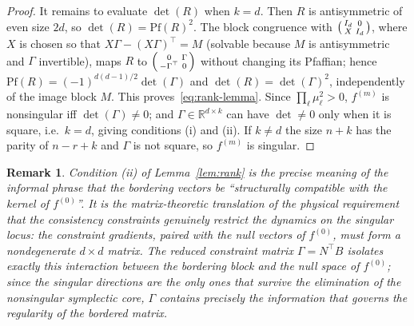 \documentclass[11pt,a4paper]{article}
\newtheorem{remark}{Remark}
\begin{document}
\begin{proof}
	It remains to evaluate $\det(R)$ when $k=d$. Then $R$ is antisymmetric of even size $2d$, so $\det(R)=\mathrm{Pf}(R)^2$. The block congruence with $\begin{psmallmatrix} I_d & 0 \\ X & I_d \end{psmallmatrix}$, where $X$ is chosen so that $X\Gamma - (X\Gamma)^{\top} = M$ (solvable because $M$ is antisymmetric and $\Gamma$ invertible), maps $R$ to $\begin{psmallmatrix} 0 & \Gamma \\ -\Gamma^{\top} & 0 \end{psmallmatrix}$ without changing its Pfaffian; hence $\mathrm{Pf}(R) = (-1)^{d(d-1)/2}\det(\Gamma)$ and $\det(R)=\det(\Gamma)^2$, independently of the image block $M$. This proves~\eqref{eq:rank-lemma}. Since $\prod_\ell\mu_\ell^2>0$, $f^{(m)}$ is nonsingular iff $\det(\Gamma)\neq 0$; and $\Gamma\in\mathbb{R}^{d\times k}$ can have $\det\neq 0$ only when it is square, i.e.\ $k=d$, giving conditions (i) and (ii). If $k\neq d$ the size $n+k$ has the parity of $n-r+k$ and $\Gamma$ is not square, so $f^{(m)}$ is singular.
\end{proof}

\begin{remark}
	Condition (ii) of Lemma~\ref{lem:rank} is the precise meaning of the informal phrase that the bordering vectors be ``structurally compatible with the kernel of $f^{(0)}$''. It is the matrix-theoretic translation of the physical requirement that the consistency constraints genuinely restrict the dynamics on the singular locus: the constraint gradients, paired with the null vectors of $f^{(0)}$, must form a nondegenerate $d\times d$ matrix. The reduced constraint matrix $\Gamma = N^{\top}B$ isolates exactly this interaction between the bordering block and the null space of $f^{(0)}$; since the singular directions are the only ones that survive the elimination of the nonsingular symplectic core, $\Gamma$ contains precisely the information that governs the regularity of the bordered matrix.
\end{remark}
\end{document}
